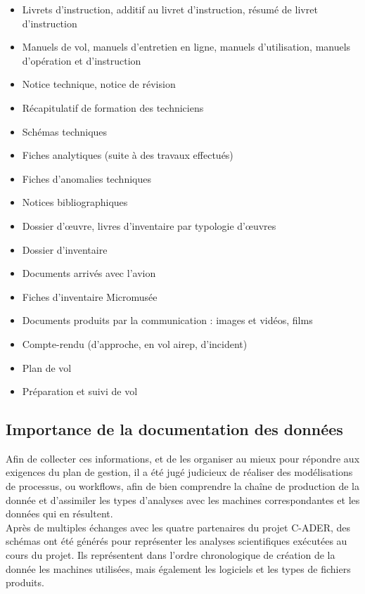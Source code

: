 \begin{itemize}
    \item Livrets d'instruction, additif au livret d'instruction, résumé de livret d'instruction
    \item Manuels de vol, manuels d'entretien en ligne, manuels d'utilisation, manuels d'opération et d'instruction
    \item Notice technique, notice de révision
    \item Récapitulatif de formation des techniciens
    \item Schémas techniques
    \item Fiches analytiques (suite à des travaux effectués)
    \item Fiches d'anomalies techniques
    \item Notices bibliographiques
    \item Dossier d'œuvre, livres d'inventaire par typologie d'œuvres
    \item Dossier d'inventaire
    \item Documents arrivés avec l'avion
    \item Fiches d’inventaire Micromusée
    \item Documents produits par la communication : images et vidéos, films
    \item Compte-rendu (d’approche, en vol airep, d’incident)
    \item Plan de vol
    \item Préparation et suivi de vol
\end{itemize}

        \subsection{Importance de la documentation des données}

Afin de collecter ces informations, et de les organiser au mieux pour répondre aux exigences du plan de gestion, il a été jugé judicieux de réaliser des modélisations de processus, ou workflows, afin de bien comprendre la chaîne de production de la donnée et d’assimiler les types d’analyses avec les machines correspondantes et les données qui en résultent.\\

Après de multiples échanges avec les quatre partenaires du projet C-ADER, des schémas ont été générés pour représenter les analyses scientifiques exécutées au cours du projet. Ils représentent dans l’ordre chronologique de création de la donnée les machines utilisées, mais également les logiciels et les types de fichiers produits.\\


